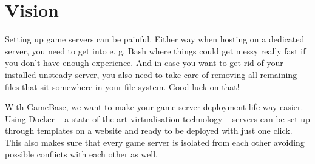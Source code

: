 \documentclass[a4paper,12pt,chapterprefix=false,bibliography=totoc,listof=totoc,]{scrreprt}
\begin{document}
\section{Vision}
Setting up game servers can be painful. Either way when hosting on a dedicated server, you need to get into e. g. Bash where things could get messy really fast if you don’t have enough experience. And in case you want to get rid of your installed unsteady server, you also need to take care of removing all remaining files that sit somewhere in your file system. Good luck on that!

With GameBase, we want to make your game server deployment life way easier. Using Docker – a state-of-the-art virtualisation technology – servers can be set up through templates on a website and ready to be deployed with just one click. This also makes sure that every game server is isolated from each other avoiding possible conflicts with each other as well.
\end{document}
